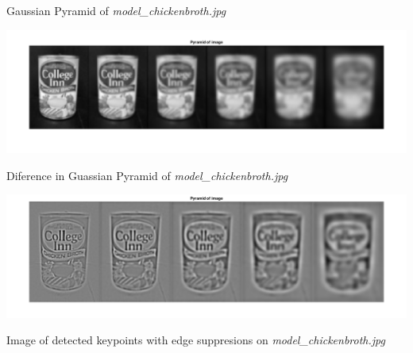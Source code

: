 \documentclass[12pt,letterpaper,boxed]{hmcpset}
\begin{document}




\begin{problem}[1.1]
Gaussian Pyramid of \textit{model\_chickenbroth.jpg}
\end{problem}

\begin{solution}
  \includegraphics[width=\textwidth]{1_1.png}
\end{solution}

\begin{problem}[1.2]
Diference in Guassian Pyramid of \textit{model\_chickenbroth.jpg}

\end{problem}

\begin{solution}
  \includegraphics[width=\textwidth]{1_2.png}

\end{solution}
\newpage
\begin{problem}[1.5]
  Image of detected keypoints with edge suppresions on \textit{model\_chickenbroth.jpg}
\end{problem}
\end{document}
